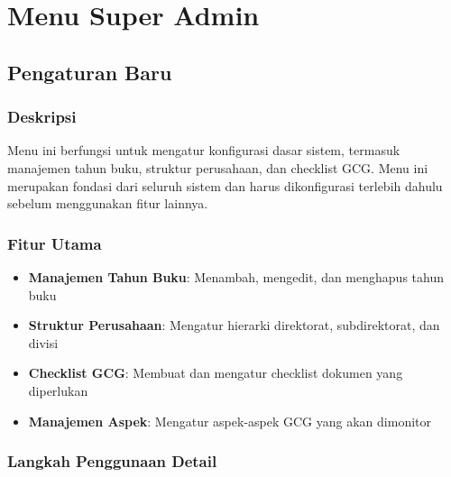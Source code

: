 \documentclass[12pt,a4paper]{article}
\begin{document}
\section{Menu Super Admin}

\subsection{Pengaturan Baru}

\subsubsection{Deskripsi}
Menu ini berfungsi untuk mengatur konfigurasi dasar sistem, termasuk manajemen tahun buku, struktur perusahaan, dan checklist GCG. Menu ini merupakan fondasi dari seluruh sistem dan harus dikonfigurasi terlebih dahulu sebelum menggunakan fitur lainnya.

\subsubsection{Fitur Utama}
\begin{itemize}
\item \textbf{Manajemen Tahun Buku}: Menambah, mengedit, dan menghapus tahun buku
\item \textbf{Struktur Perusahaan}: Mengatur hierarki direktorat, subdirektorat, dan divisi
\item \textbf{Checklist GCG}: Membuat dan mengatur checklist dokumen yang diperlukan
\item \textbf{Manajemen Aspek}: Mengatur aspek-aspek GCG yang akan dimonitor
\end{itemize}

\subsubsection{Langkah Penggunaan Detail}
\end{document}
